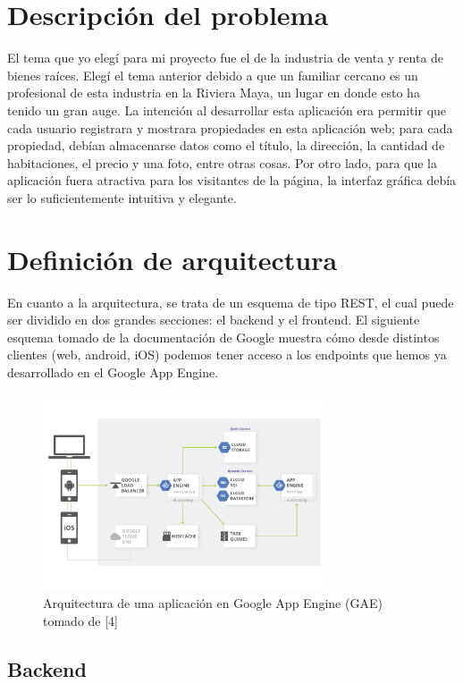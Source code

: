 \documentclass[12pt]{article}
\begin{document}
\section{Descripción del problema}

El tema que yo elegí para mi proyecto fue el de la industria de venta y renta de bienes raíces. Elegí el tema anterior debido a que un familiar cercano es un profesional de esta industria en la Riviera Maya, un lugar en donde esto ha tenido un gran auge. La intención al desarrollar esta aplicación era permitir que cada usuario registrara y mostrara propiedades en esta aplicación web; para cada propiedad, debían almacenarse datos como el título, la dirección, la cantidad de habitaciones, el precio y una foto, entre otras cosas. Por otro lado, para que la aplicación fuera atractiva para los visitantes de la página, la interfaz gráfica debía ser lo suficientemente intuitiva y elegante.

\section{Definición de arquitectura}

En cuanto a la arquitectura, se trata de un esquema de tipo REST, el cual puede ser dividido en dos grandes secciones: el backend y el frontend. El siguiente esquema tomado de la documentación de Google muestra
cómo desde distintos clientes (web, android, iOS) podemos tener acceso a los endpoints que hemos ya desarrollado en el Google App Engine.

\begin{figure}[H]
\centering
\includegraphics[width=0.75\textwidth]{01_WebApp_ArchDiagram.png}
\caption{Arquitectura de una aplicación en Google App Engine (GAE) tomado de [4]}
\end{figure} 

\subsection{Backend}
\end{document}
